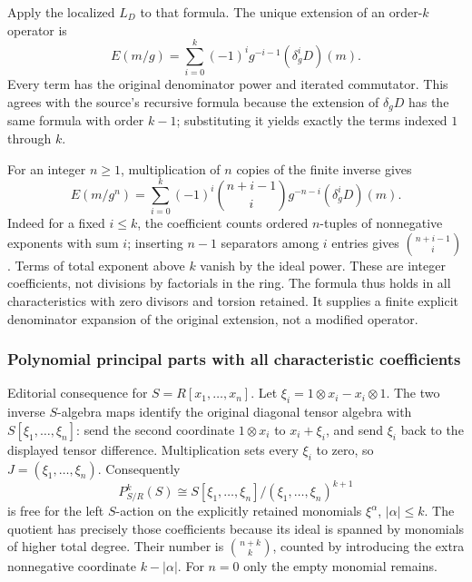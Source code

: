 Apply the localized \(L_D\) to that formula. The unique extension of an order-\(k\) operator is \[
E(m/g)=\sum_{i=0}^k(-1)^i g^{-i-1}(\delta_g^iD)(m).
\] Every term has the original denominator power and iterated commutator. This agrees with the source's recursive formula because the extension of \(\delta_gD\) has the same formula with order \(k-1\); substituting it yields exactly the terms indexed \(1\) through \(k\).

For an integer \(n\ge1\), multiplication of \(n\) copies of the finite inverse gives \[
E(m/g^n)=\sum_{i=0}^k(-1)^i\binom{n+i-1}{i}g^{-n-i}(\delta_g^iD)(m).
\] Indeed for a fixed \(i\le k\), the coefficient counts ordered \(n\)-tuples of nonnegative exponents with sum \(i\); inserting \(n-1\) separators among \(i\) entries gives \(\binom{n+i-1}{i}\). Terms of total exponent above \(k\) vanish by the ideal power. These are integer coefficients, not divisions by factorials in the ring. The formula thus holds in all characteristics with zero divisors and torsion retained. It supplies a finite explicit denominator expansion of the original extension, not a modified operator.

\subsubsection{Polynomial principal parts with all characteristic coefficients}\label{algebra-proof-043-polynomial-principal-parts-with-all-characteristic-coefficients}

Editorial consequence for \(S=R[x_1,\ldots,x_n]\). Let \(\xi_i=1\otimes x_i-x_i\otimes1\). The two inverse \(S\)-algebra maps identify the original diagonal tensor algebra with \(S[\xi_1,\ldots,\xi_n]\): send the second coordinate \(1\otimes x_i\) to \(x_i+\xi_i\), and send \(\xi_i\) back to the displayed tensor difference. Multiplication sets every \(\xi_i\) to zero, so \(J=(\xi_1,\ldots,\xi_n)\). Consequently \[
P^k_{S/R}(S)\cong S[\xi_1,\ldots,\xi_n]/(\xi_1,\ldots,\xi_n)^{k+1}
\] is free for the left \(S\)-action on the explicitly retained monomials \(\xi^\alpha\), \(|\alpha|\le k\). The quotient has precisely those coefficients because its ideal is spanned by monomials of higher total degree. Their number is \(\binom{n+k}{k}\), counted by introducing the extra nonnegative coordinate \(k-|\alpha|\). For \(n=0\) only the empty monomial remains.

